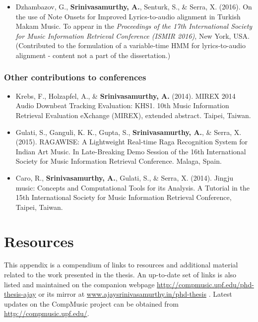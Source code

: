 \begin{itemize}[leftmargin=*]
	\item Dzhambazov, G., \textbf{Srinivasamurthy, A.}, Senturk, S., \& Serra, X. (2016). On the use of Note Onsets for Improved Lyrics-to-audio alignment in Turkish Makam Music. To appear in the \emph{Proceedings of the 17th International Society for Music Information Retrieval Conference (ISMIR 2016)}, New York, USA. {\footnotesize (Contributed to the formulation of a variable-time  {HMM} for lyrics-to-audio alignment -  content not a part of the dissertation.)}
\end{itemize}
%
\subsection*{Other contributions to conferences}
\begin{itemize}[leftmargin=*]
	\item Krebs, F., Holzapfel, A., \& \textbf{Srinivasamurthy, A.} (2014). MIREX 2014 Audio Downbeat Tracking Evaluation: KHS1. 10th Music Information Retrieval Evaluation eXchange (MIREX), extended abstract. Taipei, Taiwan.  
	\item Gulati, S., Ganguli, K. K., Gupta, S., \textbf{Srinivasamurthy, A.}, \& Serra, X. (2015). RAGAWISE: A Lightweight Real-time Raga Recognition System for Indian Art Music. In Late-Breaking Demo Session of the 16th International Society for Music Information Retrieval Conference. Malaga, Spain. 
	\item Caro, R., \textbf{Srinivasamurthy, A.}, Gulati, S., \& Serra, X. (2014). Jingju music: Concepts and Computational Tools for its Analysis. A Tutorial in the 15th International Society for Music Information Retrieval Conference, Taipei, Taiwan. 
\end{itemize}
%
%
\chapter{Resources}\label{app:resources}
This appendix is a compendium of links to resources and additional material related to the work presented in the thesis. An up-to-date set of links is also listed and maintained on the companion webpage \url{http://compmusic.upf.edu/phd-thesis-ajay} or its mirror at \url{www.ajaysrinivasamurthy.in/phd-thesis} . Latest updates on the CompMusic project can be obtained from \url{http://compmusic.upf.edu/}. 

